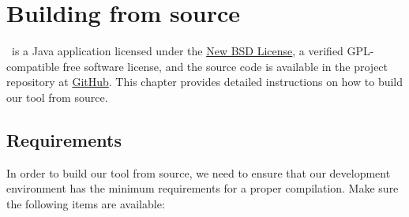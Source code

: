 \chapter{Building from source}
\label{chap:buildingfromsource}

\arara\ is a Java application licensed under the \href{http://www.opensource.org/licenses/bsd-license.php}{New BSD License}, a verified GPL-compatible free software license, and the source code is available in the project repository at \href{https://github.com/cereda/arara}{GitHub}. This chapter provides detailed instructions on how to build our tool from source.

\section{Requirements}
\label{sec:requirements}

In order to build our tool from source, we need to ensure that our development environment has the minimum requirements for a proper compilation. Make sure the following items are available:

